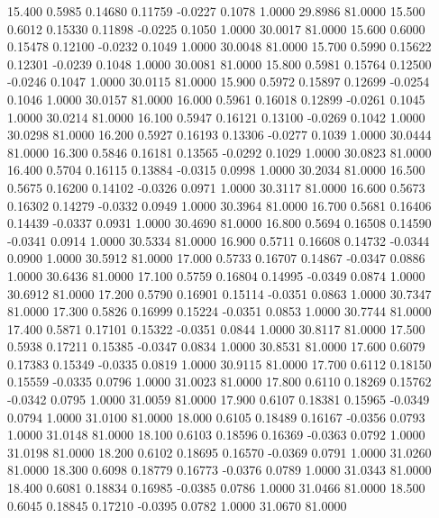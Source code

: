   15.400   0.5985   0.14680   0.11759  -0.0227   0.1078   1.0000  29.8986  81.0000
  15.500   0.6012   0.15330   0.11898  -0.0225   0.1050   1.0000  30.0017  81.0000
  15.600   0.6000   0.15478   0.12100  -0.0232   0.1049   1.0000  30.0048  81.0000
  15.700   0.5990   0.15622   0.12301  -0.0239   0.1048   1.0000  30.0081  81.0000
  15.800   0.5981   0.15764   0.12500  -0.0246   0.1047   1.0000  30.0115  81.0000
  15.900   0.5972   0.15897   0.12699  -0.0254   0.1046   1.0000  30.0157  81.0000
  16.000   0.5961   0.16018   0.12899  -0.0261   0.1045   1.0000  30.0214  81.0000
  16.100   0.5947   0.16121   0.13100  -0.0269   0.1042   1.0000  30.0298  81.0000
  16.200   0.5927   0.16193   0.13306  -0.0277   0.1039   1.0000  30.0444  81.0000
  16.300   0.5846   0.16181   0.13565  -0.0292   0.1029   1.0000  30.0823  81.0000
  16.400   0.5704   0.16115   0.13884  -0.0315   0.0998   1.0000  30.2034  81.0000
  16.500   0.5675   0.16200   0.14102  -0.0326   0.0971   1.0000  30.3117  81.0000
  16.600   0.5673   0.16302   0.14279  -0.0332   0.0949   1.0000  30.3964  81.0000
  16.700   0.5681   0.16406   0.14439  -0.0337   0.0931   1.0000  30.4690  81.0000
  16.800   0.5694   0.16508   0.14590  -0.0341   0.0914   1.0000  30.5334  81.0000
  16.900   0.5711   0.16608   0.14732  -0.0344   0.0900   1.0000  30.5912  81.0000
  17.000   0.5733   0.16707   0.14867  -0.0347   0.0886   1.0000  30.6436  81.0000
  17.100   0.5759   0.16804   0.14995  -0.0349   0.0874   1.0000  30.6912  81.0000
  17.200   0.5790   0.16901   0.15114  -0.0351   0.0863   1.0000  30.7347  81.0000
  17.300   0.5826   0.16999   0.15224  -0.0351   0.0853   1.0000  30.7744  81.0000
  17.400   0.5871   0.17101   0.15322  -0.0351   0.0844   1.0000  30.8117  81.0000
  17.500   0.5938   0.17211   0.15385  -0.0347   0.0834   1.0000  30.8531  81.0000
  17.600   0.6079   0.17383   0.15349  -0.0335   0.0819   1.0000  30.9115  81.0000
  17.700   0.6112   0.18150   0.15559  -0.0335   0.0796   1.0000  31.0023  81.0000
  17.800   0.6110   0.18269   0.15762  -0.0342   0.0795   1.0000  31.0059  81.0000
  17.900   0.6107   0.18381   0.15965  -0.0349   0.0794   1.0000  31.0100  81.0000
  18.000   0.6105   0.18489   0.16167  -0.0356   0.0793   1.0000  31.0148  81.0000
  18.100   0.6103   0.18596   0.16369  -0.0363   0.0792   1.0000  31.0198  81.0000
  18.200   0.6102   0.18695   0.16570  -0.0369   0.0791   1.0000  31.0260  81.0000
  18.300   0.6098   0.18779   0.16773  -0.0376   0.0789   1.0000  31.0343  81.0000
  18.400   0.6081   0.18834   0.16985  -0.0385   0.0786   1.0000  31.0466  81.0000
  18.500   0.6045   0.18845   0.17210  -0.0395   0.0782   1.0000  31.0670  81.0000
